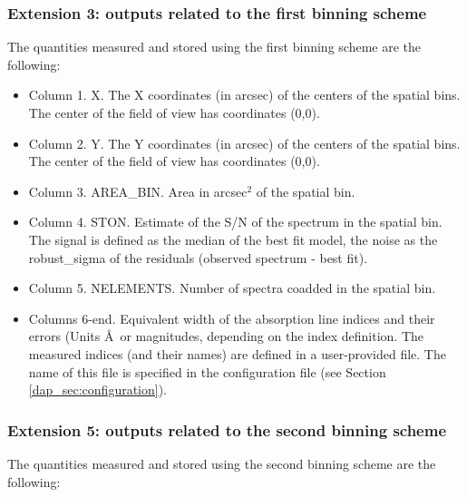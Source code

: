 \subsubsection{Extension 3: outputs related to the first binning
  scheme} 
\label{}
The quantities measured and stored using the first binning scheme are
the following:

\begin{itemize}

\item Column 1. X. The X coordinates (in arcsec) of the centers of the spatial bins. The center of the field of view has coordinates (0,0).
\item Column 2. Y. The Y coordinates (in arcsec) of the centers of the spatial bins. The center of the field of view has coordinates (0,0).
\item Column 3. AREA\_BIN. Area in arcsec$^2$ of the spatial bin.
\item Column 4. STON. Estimate of the S/N of the spectrum in the
  spatial bin. The signal is defined as the median of the best fit
  model, the noise as the robust\_sigma of the residuals (observed
  spectrum - best fit).
\item Column 5. NELEMENTS. Number of spectra coadded in the spatial bin.
\item Columns 6-end. Equivalent width of the absorption line indices
  and their errors (Units \AA\ or magnitudes, depending on the index
  definition. The measured indices (and their names) are defined in a
  user-provided file. The name of this file is specified in the
  configuration file (see Section \ref{dap_sec:configuration}).
\end{itemize}

\subsubsection{Extension 5: outputs related to the second binning
  scheme} 
\label{}
The quantities measured and stored using the second binning scheme are
the following:

